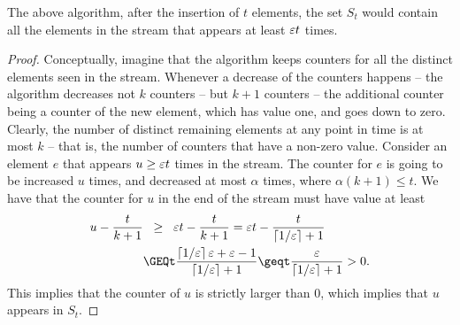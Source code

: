 \begin{lemma}
    The above algorithm, after the insertion of $t$ elements, the set
    $S_{t}$ would contain all the elements in the stream that
    appears at least ${\varepsilon} t$ times. 
\end{lemma}
\begin{proof}
    Conceptually, imagine that the algorithm keeps counters for all
    the distinct elements seen in the stream. Whenever a decrease of
    the counters happens -- the algorithm decreases not $k$ counters --
    but $k+1$ counters -- the additional counter being a counter of
    the new element, which has value one, and goes down to zero.
    Clearly, the number of distinct remaining elements at any point in
    time is at most $k$ -- that is, the number of counters that have a
    non-zero value.  Consider an element $e$ that appears
    $u \geq {\varepsilon} t$ times in the stream. The counter for $e$ is going
    to be increased $u$ times, and decreased at most $\alpha$ times,
    where
    \begin{math}
        \alpha (k+1) \leq t.
    \end{math}
    We have that the counter for $u$ in the end of the stream must
    have value at least
    \begin{align*}
        u - \frac{t}{k+1}%
        &\GEQ%
        \eps t - \frac{t}{k+1}
        = 
        \eps t - \frac{t}{\ceil{1/\eps}+1}
        \\&
        \GEQ%
        t \frac{\ceil{1/\eps}\eps +\eps - 1}{\ceil{1/\eps}+1}
        \geq%
        t \frac{\eps}{\ceil{1/\eps}+1} > 0.
    \end{align*}
    This implies that the counter of $u$ is strictly larger than $0$,
    which implies that $u$ appears in $S_{t}$.
\end{proof}













\nocite{mr-ra-95}

\ChapterEnd{}

